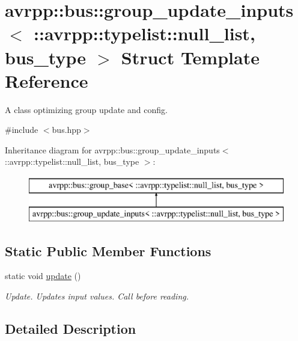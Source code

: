 \hypertarget{structavrpp_1_1bus_1_1group__update__inputs_3_01_1_1avrpp_1_1typelist_1_1null__list_00_01bus__type_01_4}{
\section{avrpp::bus::group\_\-update\_\-inputs$<$ ::avrpp::typelist::null\_\-list, bus\_\-type $>$ Struct Template Reference}
\label{structavrpp_1_1bus_1_1group__update__inputs_3_01_1_1avrpp_1_1typelist_1_1null__list_00_01bus__type_01_4}
}


A class optimizing group update and config.  




{\ttfamily \#include $<$bus.hpp$>$}

Inheritance diagram for avrpp::bus::group\_\-update\_\-inputs$<$ ::avrpp::typelist::null\_\-list, bus\_\-type $>$:\begin{figure}[H]
\begin{center}
\leavevmode
\includegraphics[height=2.000000cm]{structavrpp_1_1bus_1_1group__update__inputs_3_01_1_1avrpp_1_1typelist_1_1null__list_00_01bus__type_01_4}
\end{center}
\end{figure}
\subsection*{Static Public Member Functions}
\begin{DoxyCompactItemize}
\item 
static void \hyperlink{structavrpp_1_1bus_1_1group__update__inputs_3_01_1_1avrpp_1_1typelist_1_1null__list_00_01bus__type_01_4_a902b494504579228504147ce901b602c}{update} ()
\begin{DoxyCompactList}\small\item\em Update. Updates input values. Call before reading. \item\end{DoxyCompactList}\end{DoxyCompactItemize}


\subsection{Detailed Description}

